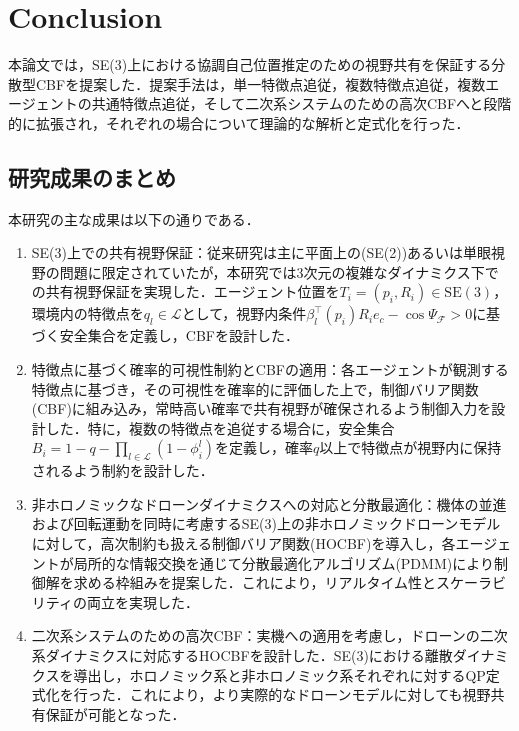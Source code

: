 \section{Conclusion}

本論文では，SE(3)上における協調自己位置推定のための視野共有を保証する分散型CBFを提案した．提案手法は，単一特徴点追従，複数特徴点追従，複数エージェントの共通特徴点追従，そして二次系システムのための高次CBFへと段階的に拡張され，それぞれの場合について理論的な解析と定式化を行った．

\subsection{研究成果のまとめ}

本研究の主な成果は以下の通りである．

\begin{enumerate}
    \item SE(3)上での共有視野保証：従来研究は主に平面上の(SE(2))あるいは単眼視野の問題に限定されていたが，本研究では3次元の複雑なダイナミクス下での共有視野保証を実現した．エージェント位置を$T_i=(p_i, R_i)\in \mathrm{SE}(3)$，環境内の特徴点を$q_l\in \mathcal{L}$として，視野内条件$\beta_l^{\top}(p_i)R_ie_c-\cos\Psi_\mathcal{F}>0$に基づく安全集合を定義し，CBFを設計した．
    
    \item 特徴点に基づく確率的可視性制約とCBFの適用：各エージェントが観測する特徴点に基づき，その可視性を確率的に評価した上で，制御バリア関数(CBF)に組み込み，常時高い確率で共有視野が確保されるよう制御入力を設計した．特に，複数の特徴点を追従する場合に，安全集合$B_{i}=1-q-\prod_{l\in\mathcal{L}}(1-\phi_{i}^l)$を定義し，確率$q$以上で特徴点が視野内に保持されるよう制約を設計した．
    
    \item 非ホロノミックなドローンダイナミクスへの対応と分散最適化：機体の並進および回転運動を同時に考慮するSE(3)上の非ホロノミックドローンモデルに対して，高次制約も扱える制御バリア関数(HOCBF)を導入し，各エージェントが局所的な情報交換を通じて分散最適化アルゴリズム(PDMM)により制御解を求める枠組みを提案した．これにより，リアルタイム性とスケーラビリティの両立を実現した．
    
    \item 二次系システムのための高次CBF：実機への適用を考慮し，ドローンの二次系ダイナミクスに対応するHOCBFを設計した．SE(3)における離散ダイナミクスを導出し，ホロノミック系と非ホロノミック系それぞれに対するQP定式化を行った．これにより，より実際的なドローンモデルに対しても視野共有保証が可能となった．
\end{enumerate}

